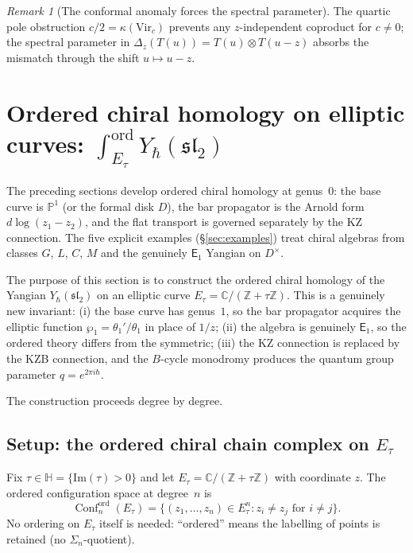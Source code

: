 \documentclass[11pt,reqno]{amsart}
\theoremstyle{definition}
\theoremstyle{remark}
\newtheorem{remark}[theorem]{Remark}
\newcommand{\Eone}{\mathsf{E}_{1}}
\DeclareMathOperator{\Conf}{Conf}
\newcommand{\CC}{\mathbb{C}}
\newcommand{\ZZ}{\mathbb{Z}}
\newcommand{\PP}{\mathbb{P}}
\newcommand{\HHH}{\mathbb{H}}
\numberwithin{equation}{section}
\begin{document}
\begin{remark}[The conformal anomaly forces the spectral parameter]
\label{rem:conformal-anomaly-forces-spectral}
The quartic pole obstruction
$c/2 = \kappa(\mathrm{Vir}_c)$
prevents any $z$-independent coproduct for $c \neq 0$;
the spectral parameter in
$\Delta_z(T(u)) = T(u) \otimes T(u - z)$ absorbs the
mismatch through the shift $u \mapsto u - z$.
\end{remark}


\section{Ordered chiral homology on elliptic curves:
$\int_{E_\tau}^{\mathrm{ord}} Y_\hbar(\mathfrak{sl}_2)$}
\label{sec:elliptic-ordered}

The preceding sections develop ordered chiral homology at
genus~$0$: the base curve is $\PP^1$ (or the formal disk
$D$), the bar propagator is the Arnold form $d\log(z_1 - z_2)$,
and the flat transport is governed separately by the KZ
connection. The five
explicit examples (\S\ref{sec:examples}) treat chiral
algebras from classes $G$, $L$, $C$, $M$ and the genuinely
$\Eone$ Yangian on $D^\times$.

The purpose of this section is to construct the ordered
chiral homology of the Yangian
$Y_\hbar(\mathfrak{sl}_2)$ on an elliptic curve
$E_\tau = \CC / (\ZZ + \tau\ZZ)$. This is a genuinely new
invariant: (i) the base curve has genus~$1$, so the bar
propagator acquires the elliptic function
$\wp_1 = \theta_1'/\theta_1$ in place of $1/z$; (ii) the algebra is genuinely $\Eone$,
so the ordered theory differs from the symmetric; (iii)
the KZ connection is replaced by the KZB connection, and
the $B$-cycle monodromy produces the quantum group
parameter $q = e^{2\pi i \hbar}$.

The construction proceeds degree by degree.

\subsection{Setup: the ordered chiral chain complex on
$E_\tau$}
\label{subsec:elliptic-setup}

Fix $\tau \in \HHH = \{\mathrm{Im}(\tau) > 0\}$ and let
$E_\tau = \CC/(\ZZ + \tau\ZZ)$ with coordinate $z$. The
ordered configuration space at degree~$n$ is
\begin{equation}\label{eq:conf-elliptic}
  \Conf_n^{\mathrm{ord}}(E_\tau)
  = \{(z_1, \ldots, z_n) \in E_\tau^n :
  z_i \neq z_j \text{ for } i \neq j\}.
\end{equation}
No ordering on $E_\tau$ itself is needed: ``ordered'' means
the labelling of points is retained (no $\Sigma_n$-quotient).
\end{document}
